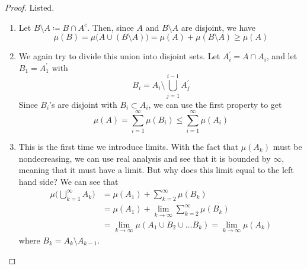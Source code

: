  \begin{proof}
  Listed. 
  \begin{enumerate}
    \item Let $B \setminus A \coloneqq B \cap A^c$. Then, since $A$ and $B \setminus A$ are disjoint, we have 
    \begin{equation}
      \mu(B) = \mu\big( A \cup (B \setminus A) \big) = \mu(A) + \mu(B \setminus A) \geq \mu(A)
    \end{equation}
    
    \item We again try to divide this union into disjoint sets. Let $A_i^\prime = A \cap A_i$, and let $B_1 = A_1^\prime$ with 
    \begin{equation}
      B_i = A_i \setminus \bigcup_{j=1}^{i-1} A^\prime_j
    \end{equation}
    Since $B_i$'s are disjoint with $B_i \subset A_i$, we can use the first property to get 
    \begin{equation}
      \mu(A) = \sum_{i=1}^\infty \mu(B_i) \leq \sum_{i=1}^\infty \mu(A_i)
    \end{equation}
    
    \item This is the first time we introduce limits. With the fact that $\mu(A_k)$ must be nondecreasing, we can use real analysis and see that it is bounded by $\infty$, meaning that it must have a limit. But why does this limit equal to the left hand side? We can see that 
    \begin{align}
      \mu\bigg( \bigcup_{k=1}^\infty A_k \bigg) & = \mu(A_1) + \sum_{k=2}^\infty \mu(B_k) \\
      & = \mu(A_1) + \lim_{k \rightarrow \infty} \sum_{k=2}^\infty \mu(B_k) \\
      & = \lim_{k \rightarrow \infty} \mu(A_1 \cup B_2 \cup \ldots B_k)  = \lim_{k \rightarrow \infty} \mu(A_k) 
    \end{align}
    where $B_k = A_k \setminus A_{k-1}$. 
    

\end{enumerate}
\end{proof}
